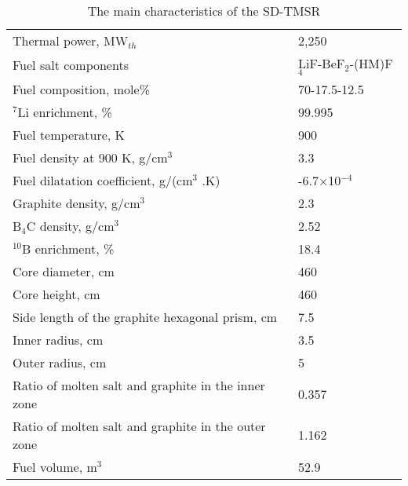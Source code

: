 \begin{table}  %
	\caption{The main characteristics of the SD-TMSR \cite{li_optimization_2018}}
	\vspace{0.1in}
	\begin{tabularx}{\textwidth}{l | l}
		\hline
		Thermal power, MW$_{th}$          				&  2,250  \\ 
		Fuel salt components                            & LiF-BeF$_2$-(\gls{HM})F$_4$ \\
		Fuel composition, mole\%                        & 70-17.5-12.5    \\
		$^7$Li enrichment, \%        				& 99.995   \\
		Fuel temperature, K 							& 900  \\
		Fuel density at 900 K, g/cm$^3$		  		& 3.3 \\
		Fuel dilatation coefficient, g/(cm$^3$ $.$K)  &  -6.7$\times$10$^{-4}$ \\
		Graphite density, g/cm$^3$             	    & 2.3	\\  
		B$_4$C density, g/cm$^3$					& 2.52  \\
		$^{10}$B enrichment, \%						&  18.4  \\
		Core diameter, cm								& 460  \\
		Core height, cm									& 460  \\
		Side length of the graphite hexagonal prism, cm   & 7.5 \\
		Inner radius, cm							& 3.5  \\
		Outer radius, cm							& 5  \\
		Ratio of molten salt and graphite in the inner zone	&  0.357  \\
		Ratio of molten salt and graphite in the outer zone &  1.162  \\
		Fuel volume, m$^3$  &	52.9 \\
		\hline
	\end{tabularx}
	\label{tab:table1}
\end{table}


